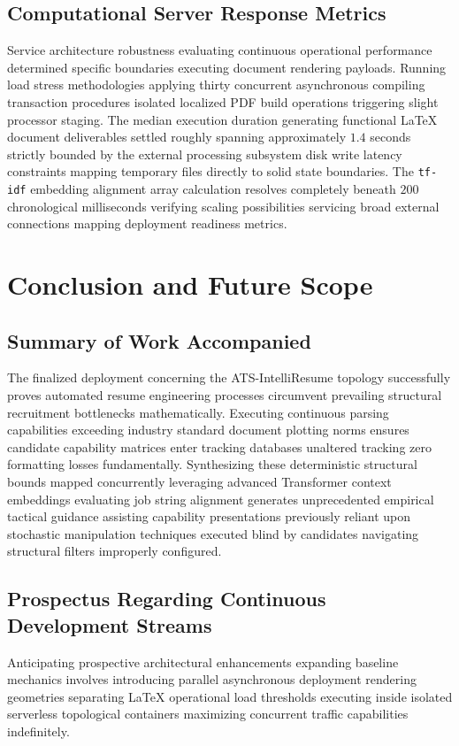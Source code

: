 \documentclass[12pt,a4paper]{report}
\begin{document}
\section{Computational Server Response Metrics}
Service architecture robustness evaluating continuous operational performance determined specific boundaries executing document rendering payloads. Running load stress methodologies applying thirty concurrent asynchronous compiling transaction procedures isolated localized PDF build operations triggering slight processor staging. The median execution duration generating functional LaTeX document deliverables settled roughly spanning approximately $1.4$ seconds strictly bounded by the external processing subsystem disk write latency constraints mapping temporary files directly to solid state boundaries. The \texttt{tf-idf} embedding alignment array calculation resolves completely beneath $200$ chronological milliseconds verifying scaling possibilities servicing broad external connections mapping deployment readiness metrics.

\chapter{Conclusion and Future Scope}

\section{Summary of Work Accompanied}
The finalized deployment concerning the ATS-IntelliResume topology successfully proves automated resume engineering processes circumvent prevailing structural recruitment bottlenecks mathematically. Executing continuous parsing capabilities exceeding industry standard document plotting norms ensures candidate capability matrices enter tracking databases unaltered tracking zero formatting losses fundamentally. Synthesizing these deterministic structural bounds mapped concurrently leveraging advanced Transformer context embeddings evaluating job string alignment generates unprecedented empirical tactical guidance assisting capability presentations previously reliant upon stochastic manipulation techniques executed blind by candidates navigating structural filters improperly configured.

\section{Prospectus Regarding Continuous Development Streams}
Anticipating prospective architectural enhancements expanding baseline mechanics involves introducing parallel asynchronous deployment rendering geometries separating LaTeX operational load thresholds executing inside isolated serverless topological containers maximizing concurrent traffic capabilities indefinitely. 
\end{document}
